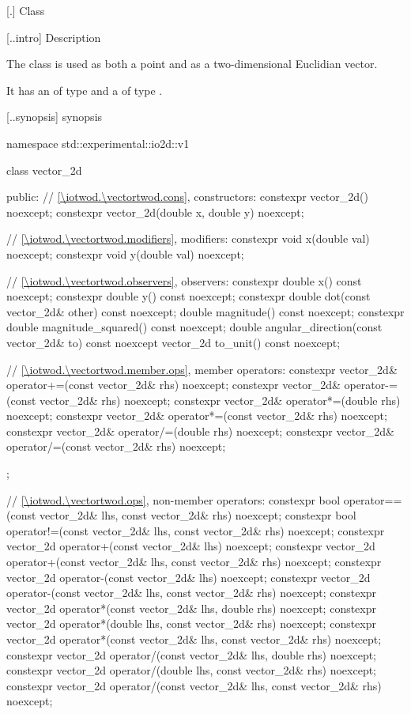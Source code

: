  [\iotwod.\vectortwod] {Class }

 [\iotwod.\vectortwod.intro] { Description}

%
\pnum
The class  is used as both a point and as a two-dimensional Euclidian vector.

\pnum
It has an  of type  and a  of type .

 [\iotwod.\vectortwod.synopsis] { synopsis}

\begin{codeblock}
namespace std::experimental::io2d::v1 {
  class vector_2d {
  public:
    // \ref{\iotwod.\vectortwod.cons}, constructors:
    constexpr vector_2d() noexcept;
    constexpr vector_2d(double x, double y) noexcept;

    // \ref{\iotwod.\vectortwod.modifiers}, modifiers:
    constexpr void x(double val) noexcept;
    constexpr void y(double val) noexcept;
    
    // \ref{\iotwod.\vectortwod.observers}, observers:
    constexpr double x() const noexcept;
    constexpr double y() const noexcept;
    constexpr double dot(const vector_2d& other) const noexcept;
    double magnitude() const noexcept;
    constexpr double magnitude_squared() const noexcept;
    double angular_direction(const vector_2d& to) const noexcept
    vector_2d to_unit() const noexcept;
    
    // \ref{\iotwod.\vectortwod.member.ops}, member operators:
    constexpr vector_2d& operator+=(const vector_2d& rhs) noexcept;
    constexpr vector_2d& operator-=(const vector_2d& rhs) noexcept;
    constexpr vector_2d& operator*=(double rhs) noexcept;
    constexpr vector_2d& operator*=(const vector_2d& rhs) noexcept;
    constexpr vector_2d& operator/=(double rhs) noexcept;
    constexpr vector_2d& operator/=(const vector_2d& rhs) noexcept;
  };
  
  // \ref{\iotwod.\vectortwod.ops}, non-member operators:
  constexpr bool operator==(const vector_2d& lhs, const vector_2d& rhs)
    noexcept;
  constexpr bool operator!=(const vector_2d& lhs, const vector_2d& rhs)
    noexcept;
  constexpr vector_2d operator+(const vector_2d& lhs) noexcept;
  constexpr vector_2d operator+(const vector_2d& lhs, const vector_2d& rhs)
    noexcept;
  constexpr vector_2d operator-(const vector_2d& lhs) noexcept;
  constexpr vector_2d operator-(const vector_2d& lhs, const vector_2d& rhs)
    noexcept;
  constexpr vector_2d operator*(const vector_2d& lhs, double rhs) noexcept;
  constexpr vector_2d operator*(double lhs, const vector_2d& rhs) noexcept;
  constexpr vector_2d operator*(const vector_2d& lhs, const vector_2d& rhs)
    noexcept;
  constexpr vector_2d operator/(const vector_2d& lhs, double rhs) noexcept;
  constexpr vector_2d operator/(double lhs, const vector_2d& rhs) noexcept;
  constexpr vector_2d operator/(const vector_2d& lhs, const vector_2d& rhs)
    noexcept;
}
\end{codeblock}

